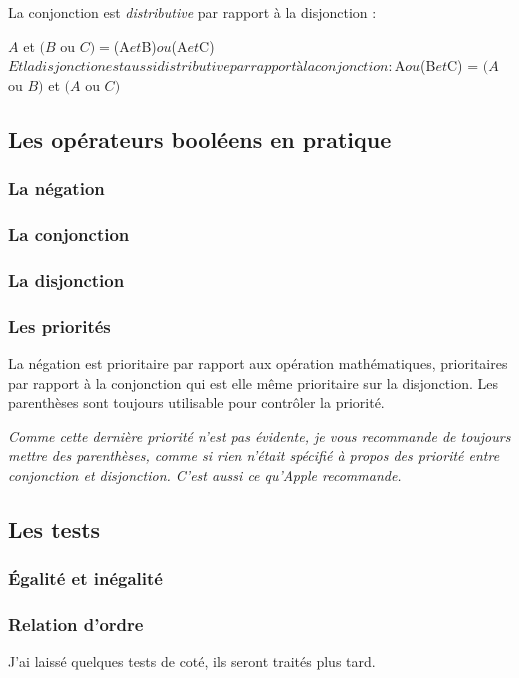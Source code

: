 La conjonction est \emph{distributive} par rapport à la disjonction :

$A$ et $(B$ ou $C) = $(A$ et $B)$ ou $(A$ et $C)$

Et la disjonction est aussi distributive par rapport à la conjonction :

$A$ ou $(B$ et $C) = $(A$ ou $B)$ et $(A$ ou $C)$

\subsection{Les opérateurs booléens en pratique}
\subsubsection{La négation}
\subsubsection{La conjonction}
\subsubsection{La disjonction}
\subsubsection{Les priorités}
La négation est prioritaire par rapport aux opération mathématiques, prioritaires par rapport à la conjonction qui est elle même prioritaire sur la disjonction. Les parenthèses sont toujours utilisable pour contrôler la priorité.

\emph{Comme cette dernière priorité n'est pas évidente, je vous recommande de toujours mettre des parenthèses, comme si rien n'était spécifié à propos des priorité entre conjonction et disjonction. C'est aussi ce qu'\emph{Apple} recommande.}
\subsection{Les tests}
\subsubsection{Égalité et inégalité}

\subsubsection{Relation d'ordre}

J'ai laissé quelques tests de coté, ils seront traités plus tard.
